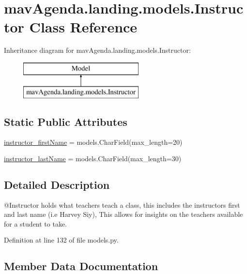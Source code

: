 \hypertarget{classmavAgenda_1_1landing_1_1models_1_1Instructor}{}\section{mav\+Agenda.\+landing.\+models.\+Instructor Class Reference}
\label{classmavAgenda_1_1landing_1_1models_1_1Instructor}
Inheritance diagram for mav\+Agenda.\+landing.\+models.\+Instructor\+:\begin{figure}[H]
\begin{center}
\leavevmode
\includegraphics[height=2.000000cm]{classmavAgenda_1_1landing_1_1models_1_1Instructor}
\end{center}
\end{figure}
\subsection*{Static Public Attributes}
\begin{DoxyCompactItemize}
\item 
\mbox{\hyperlink{classmavAgenda_1_1landing_1_1models_1_1Instructor_a817a5ee8e4bee3d4711b43945b6a7019}{instructor\+\_\+first\+Name}} = models.\+Char\+Field(max\+\_\+length=20)
\item 
\mbox{\hyperlink{classmavAgenda_1_1landing_1_1models_1_1Instructor_ae220496393374d12b87a2041e43cea02}{instructor\+\_\+last\+Name}} = models.\+Char\+Field(max\+\_\+length=30)
\end{DoxyCompactItemize}


\subsection{Detailed Description}
\begin{DoxyVerb}@Instructor holds what teachers teach a class, this includes the
        instructors first and last name (i.e Harvey Siy),
        This allows for insights on the teachers available for a student to take.
\end{DoxyVerb}
 

Definition at line 132 of file models.\+py.



\subsection{Member Data Documentation}
\mbox{\label{classmavAgenda_1_1landing_1_1models_1_1Instructor_a817a5ee8e4bee3d4711b43945b6a7019}} 
